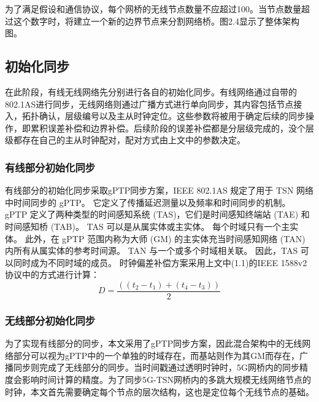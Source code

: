 \documentclass[UTF8,a4paper,12pt]{ctexart}
\numberwithin{equation}{section}
\begin{document}
	为了满足假设和通信协议，每个网桥的无线节点数量不应超过100。当节点数量超过这个数字时，将建立一个新的边界节点来分割网络桥。图2.4显示了整体架构图。
	
	\begin{figure}[htb]
	\end{figure}
	
	\subsection{初始化同步}
	
	在此阶段，有线无线网络先分别进行各自的初始化同步。有线网络通过自带的802.1AS进行同步，无线网络则通过广播方式进行单向同步，其内容包括节点接入，拓扑确认，层级编号以及主从时钟定位。这些参数将被用于确定后续的同步操作，即累积误差补偿和边界补偿。后续阶段的误差补偿都是分层级完成的，没个层级都存在自己的主从时钟配对，配对方式由上文中的参数决定。
	\subsubsection{有线部分初始化同步}
	
	有线部分的初始化同步采取gPTP同步方案，IEEE 802.1AS 规定了用于 TSN 网络中时间同步的 gPTP。 它定义了传播延迟测量以及频率和时间同步的机制。 gPTP 定义了两种类型的时间感知系统 (TAS)，它们是时间感知终端站 (TAE) 和时间感知桥 (TAB)。 TAS 可以是从属实体或主实体。 每个时域只有一个主实体。 此外，在 gPTP 范围内称为大师 (GM) 的主实体充当时间感知网络 (TAN) 内所有从属实体的参考时间源。 TAN 与一个或多个时域相关联。 因此，TAS 可以同时成为不同时域的成员。
	时钟偏差补偿方案采用上文中(1.1)的IEEE 1588v2协议中的方式进行计算：
	\begin{equation}
		D = \frac{((t_2-t_1)+(t_4-t_3))}{2} 
	\end{equation}
	\subsubsection{无线部分初始化同步}
	为了实现有线部分的同步，本文采用了gPTP同步方案，因此混合架构中的无线网络部分可以视为gPTP中的一个单独的时域存在，而基站则作为其GM而存在，广播同步则完成了无线部分的同步。当时间戳通过透明时钟时，5G网桥内的同步精度会影响时间计算的精度。为了同步5G-TSN网桥内的多跳大规模无线网络节点的时钟，本文首先需要确定每个节点的层次结构，这也是定位每个无线节点的基础。
	
\end{document}
